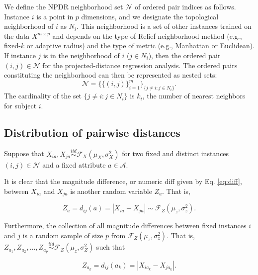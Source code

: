 \documentclass[10pt,letterpaper]{article}\usepackage[]{graphicx}\usepackage[]{color}
\begin{document}
We define the NPDR neighborhood set $\mathcal{N}$ of ordered pair indices as follows. Instance $i$ is a point in $p$ dimensions, and we designate the topological neighborhood of $i$ as $N_{i}$. This neighborhood is a set of other instances trained on the data $X^{m \times p}$ and depends on the type of Relief neighborhood method (e.g., fixed-$k$ or adaptive radius) and the type of metric (e.g., Manhattan or Euclidean). If instance $j$ is in the neighborhood of $i$ ($j \in N_{i}$), then the ordered pair $(i,j) \in \mathcal{N}$ for the projected-distance regression analysis. The ordered pairs constituting the neighborhood can then be represented as nested sets:
\begin{equation}\label{eq:N}
\mathcal{N}=\{\{(i, j)\}_{i=1}^{m}\}_{\{j \ne i : j \in N_{i}\}}.
\end{equation}
The cardinality of the set $\{j \ne i : j \in N_{i}\}$ is $k_i$, the number of nearest neighbors for subject $i$. 

\subsection{Distribution of pairwise distances}

Suppose that $X_{ia}, X_{ja} \overset{iid}{\sim} \mathcal{F}_X(\mu_X,\sigma^2_X)$ for two fixed and distinct instances $(i,j) \in \mathcal{N}$ and a fixed attribute $a \in \mathcal{A}$. 

It is clear that the magnitude difference, or numeric diff given by Eq. \ref{eq:diff}, between $X_{ia}$ and $X_{ja}$ is another random variable $Z_a$. That is,

\begin{equation}\label{eq:diffDistr}
Z_a = d_{ij}(a) = |X_{ia} - X_{ja}| \sim \mathcal{F}_Z(\mu_z,\sigma^2_z).
\end{equation}

Furthermore, the collection of all magnitude differences between fixed instances $i$ and $j$ is a random sample of size $p$ from $\mathcal{F}_Z(\mu_z,\sigma^2_z)$. That is, $Z_{a_1},Z_{a_2},\dots,Z_{a_p} \overset{iid}{\sim} \mathcal{F}_Z(\mu_z,\sigma^2_Z)$ such that

\begin{equation}\label{eq:AlldiffDistr}
Z_{a_k} = d_{ij}(a_k) = |X_{ia_k} - X_{ja_k}|.
\end{equation}
\end{document}
